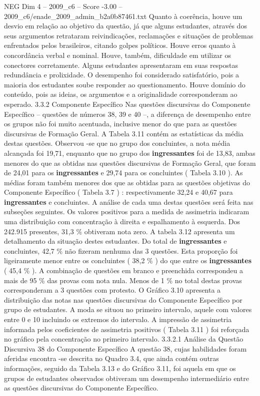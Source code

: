 \begin{textsample}{NEG Dim 4 – 2009\_c6 – Score -3.00 – 2009\_c6/enade\_2009\_admin\_b2a0b87461.txt}
Quanto à coerência, houve um desvio em relação ao objetivo da questão, já que alguns estudantes, através dos seus argumentos retrataram reivindicações, reclamações e situações de problemas enfrentados pelos brasileiros, citando golpes políticos.
Houve erros quanto à concordância verbal e nominal.
Houve, também, dificuldade em utilizar os conectores corretamente.
Alguns estudantes apresentaram em suas respostas redundância e prolixidade.
O desempenho foi considerado satisfatório, pois a maioria dos estudantes soube responder ao questionamento.
Houve domínio do conteúdo, pois as ideias, os argumentos e a originalidade corresponderam ao esperado. 3.3.2 Componente Específico Nas questões discursivas do Componente Específico – questões de números 38, 39 e 40 –, a diferença de desempenho entre os grupos não foi muito acentuada, inclusive menor do que para as questões discursivas de Formação Geral.
A Tabela 3.11 contém as estatísticas da média destas questões.
Observou -se que no grupo dos concluintes, a nota média alcançada foi 19,71, enquanto que no grupo dos \textbf{ingressantes} foi de 13,83, ambas menores do que as obtidas nas questões discursivas de Formação Geral, que foram de 24,01 para os \textbf{ingressantes} e 29,74 para os concluintes ( Tabela 3.10 ).
As médias foram também menores dos que as obtidas para as questões objetivas do Componente Específico ( Tabela 3.7 ) : respectivamente 32,24 e 40,67 para \textbf{ingressantes} e concluintes.
A análise de cada uma destas questões será feita nas subseções seguintes.
Os valores positivos para a medida de assimetria indicaram uma distribuição com concentração à direita e espalhamento à esquerda.
Dos 242.915 presentes, 31,3 \% obtiveram nota zero.
A tabela 3.12 apresenta um detalhamento da situação destes estudantes.
Do total de \textbf{ingressantes} e concluintes, 42,7 \% não fizeram nenhuma das 3 questões.
Esta proporção foi ligeiramente menor entre os concluintes ( 38,2 \% ) do que entre os \textbf{ingressantes} ( 45,4 \% ).
A combinação de questões em branco e preenchida correspondeu a mais de 95 \% das provas com nota nula.
Menos de 1 \% no total destas provas corresponderam a 3 questões com protesto.
O Gráfico 3.10 apresenta a distribuição das notas nas questões discursivas do Componente Específico por grupo de estudantes.
A moda se situou no primeiro intervalo, aquele com valores entre 0 e 10 incluindo os extremos do intervalo.
A impressão de assimetria informada pelos coeficientes de assimetria positivos ( Tabela 3.11 ) foi reforçada no gráfico pela concentração no primeiro intervalo. 3.3.2.1 Análise da Questão Discursiva 38 do Componente Específico A questão 38, cujas habilidades foram aferidas encontra -se descrita no Quadro 3.4, que ainda contém outras informações, seguido da Tabela 3.13 e do Gráfico 3.11, foi aquela em que os grupos de estudantes observados obtiveram um desempenho intermediário entre as questões discursivas do Componente Específico.

\end{textsample}
